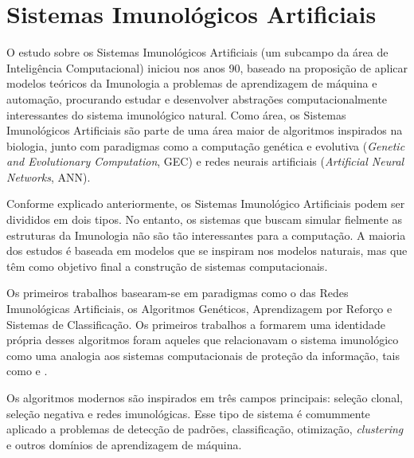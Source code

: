 \chapter{Sistemas Imunológicos Artificiais}
\label{chap:ais}

O estudo sobre os Sistemas Imunológicos Artificiais (um subcampo da área de Inteligência Computacional) iniciou nos anos 90, baseado na proposição de aplicar modelos teóricos da Imunologia a problemas de aprendizagem de máquina e automação, procurando estudar e desenvolver abstrações computacionalmente interessantes do sistema imunológico natural. Como área, os Sistemas Imunológicos Artificiais são parte de uma área maior de algoritmos inspirados na biologia, junto com paradigmas como a computação genética e evolutiva (\emph{Genetic and Evolutionary Computation}, GEC) e redes neurais artificiais (\emph{Artificial Neural Networks}, ANN).

Conforme explicado anteriormente, os Sistemas Imunológico Artificiais podem ser divididos em dois tipos. No entanto, os sistemas que buscam simular fielmente as estruturas da Imunologia não são tão interessantes para a computação. A maioria dos estudos é baseada em modelos que se inspiram nos modelos naturais, mas que têm como objetivo final a construção de sistemas computacionais.

Os primeiros trabalhos basearam-se em paradigmas como o das Redes Imunológicas Artificiais, os Algoritmos Genéticos, Aprendizagem por Reforço e Sistemas de Classificação. Os primeiros trabalhos a formarem uma identidade própria desses algoritmos foram aqueles que relacionavam o sistema imunológico como uma analogia aos sistemas computacionais de proteção da informação, tais como \citet{Forrest1994} e \citet{Forrest1997}.

Os algoritmos modernos são inspirados em três campos principais: seleção clonal, seleção negativa e redes imunológicas. Esse tipo de sistema é comummente aplicado a problemas de detecção de padrões, classificação, otimização, \emph{clustering} e outros domínios de aprendizagem de máquina.

